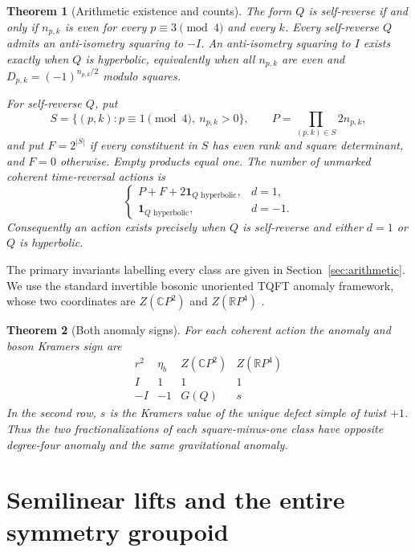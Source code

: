 \documentclass{amsart}
\newtheorem{theorem}{Theorem}[section]
\theoremstyle{definition}\newtheorem{definition}[theorem]{Definition}
\theoremstyle{remark}\newtheorem{remark}[theorem]{Remark}
\newcommand{\C}{\mathbb C}\newcommand{\F}{\mathbb F}
\newcommand{\ind}{\mathbf 1}
\begin{document}
\begin{theorem}[Arithmetic existence and counts]\label{thm:counts}
The form $Q$ is self-reverse if and only if $n_{p,k}$ is even for
every $p\equiv3\pmod4$ and every $k$. Every self-reverse $Q$ admits an
anti-isometry squaring to $-I$. An anti-isometry squaring to $I$ exists
exactly when $Q$ is hyperbolic, equivalently when all $n_{p,k}$ are even
and $D_{p,k}=(-1)^{n_{p,k}/2}$ modulo squares.

For self-reverse $Q$, put
\[
 S=\{(p,k):p\equiv1\pmod4,\ n_{p,k}>0\},\qquad
 P=\prod_{(p,k)\in S}2n_{p,k},
\]
and put $F=2^{|S|}$ if every constituent in $S$ has even rank and square
determinant, and $F=0$ otherwise. Empty products equal one.
The number of unmarked coherent time-reversal actions is
\begin{equation}\label{eq:count}
 \begin{cases}
       P+F+2\ind_{Q\text{ hyperbolic}},&d=1,\\
       \ind_{Q\text{ hyperbolic}},&d=-1.
 \end{cases}
\end{equation}
Consequently an action exists precisely when $Q$ is self-reverse and
either $d=1$ or $Q$ is hyperbolic.
\end{theorem}

The primary invariants labelling every class are given in
Section~\ref{sec:arithmetic}. We use the standard invertible bosonic
unoriented TQFT anomaly framework, whose two coordinates are
$Z(\C P^2)$ and $Z(\mathbb R P^4)$ \cite[Section VII.B]{BBCJW}.

\begin{theorem}[Both anomaly signs]\label{thm:anomaly}
For each coherent action the anomaly and boson Kramers sign are
\[
\begin{array}{c|c|c|c}
 r^2&\eta_b&Z(\C P^2)&Z(\mathbb R P^4)\\ \hline
 I&1&1&1\\
 -I&-1&G(Q)&s
\end{array}
\]
In the second row, $s$ is the Kramers value of the unique defect simple
of twist $+1$. Thus the two fractionalizations of each square-minus-one
class have opposite degree-four anomaly and the same gravitational anomaly.
\end{theorem}

\section{Semilinear lifts and the entire symmetry groupoid}
\end{document}
